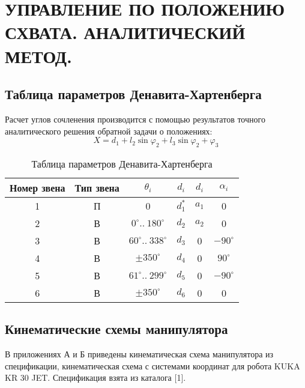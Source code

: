 \chapter{\MakeUppercase{Управление по положению схвата. Аналитический метод. }}
\section{Таблица параметров Денавита-Хартенберга}
Расчет углов сочленения производится с помощью результатов точного аналитического решения обратной задачи о положениях:
\[ X=d_1+l_2\sin\varphi_2+l_3\sin{\varphi_2+\varphi_3} \]

\begin{table}[ht]
    \caption{Таблица параметров Денавита-Хартенберга}
    \label{table_dh}
    \centering
    \begin{tabular}{|c|c|c|c|c|c|}
    \hline Номер звена & Тип звена & $ \theta_i $ & $ d_i $ & $ d_i $ & $ \alpha_i $ \\
    \hline 1 & П & 0                            & $ d_{1}^{*} $ & $ a_1 $ & 0  \\
    \hline 2 & В & $ 0^\circ ..\: 180^\circ $   & $ d_2 $ & $ a_2 $ & 0 \\
    \hline 3 & В & $ 60^\circ ..\: 338^\circ $  & $ d_3 $ & 0 & $ -90^\circ $ \\
    \hline 4 & В & $ \pm 350^\circ $            & $ d_4 $ & 0 & $ 90^\circ $ \\
    \hline 5 & В & $ 61^\circ ..\: 299^\circ $  & $ d_5 $ & 0 & $ -90^\circ $ \\
    \hline 6 & В & $ \pm 350^\circ $            & $ d_6 $ & 0 & 0 \\
    \hline
    \end{tabular}
\end{table}

\section{Кинематические схемы манипулятора}

В приложениях А и Б приведены кинематическая схема манипулятора из спецификации, кинематическая схема с системами координат для робота KUKA KR 30 JET. Спецификация взята из каталога [1]. %

